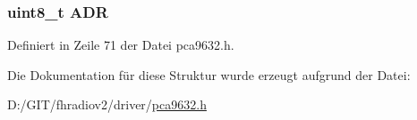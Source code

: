\subsubsection[{A\+D\+R}]{\setlength{\rightskip}{0pt plus 5cm}uint8\+\_\+t A\+D\+R}\label{structpca9632__subadr_a3f0aebe309fed43964b4309ad88f9fb5}


Definiert in Zeile 71 der Datei pca9632.\+h.



Die Dokumentation für diese Struktur wurde erzeugt aufgrund der Datei\+:\begin{DoxyCompactItemize}
\item 
D\+:/\+G\+I\+T/fhradiov2/driver/\hyperlink{pca9632_8h}{pca9632.\+h}\end{DoxyCompactItemize}
